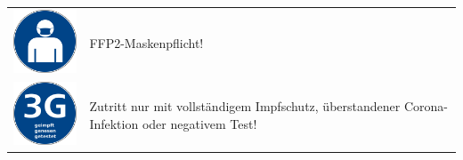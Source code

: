\documentclass[24pt, a4paper, portrait]{article}
\begin{document}
\begin{tabular}{ m{3.7cm} m{12.5cm} }
    \vspace{2mm}
    \includegraphics[width=3cm]{maskenpflicht} & FFP2-Maskenpflicht! \\
    \vspace{2mm}
    \includegraphics[width=3cm]{3g} & Zutritt nur mit vollständigem Impfschutz, überstandener Corona-Infektion oder negativem Test! \\
\end{tabular}
\end{document}
